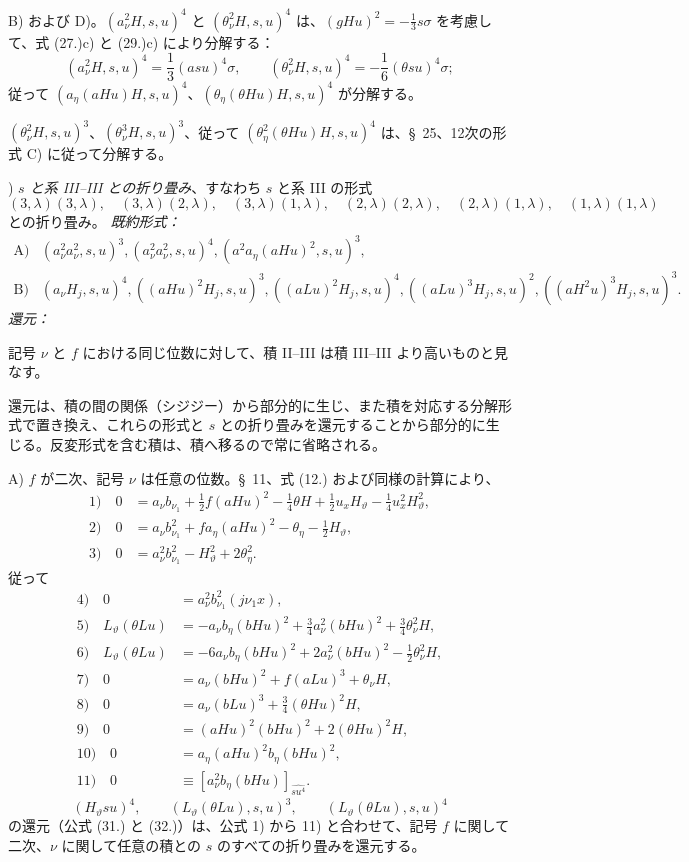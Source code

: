 \documentclass[11pt]{article}
\begin{document}
B) および D)。$(a_\nu^2H,s,u)^4$ と $(\theta_\nu^2H,s,u)^4$ は、$(gHu)^2=-\frac13s\sigma$ を考慮して、式 (27.)c) と (29.)c) により分解する：
\[
(a_\nu^2H,s,u)^4=\frac13(asu)^4\sigma,
\qquad
(\theta_\nu^2H,s,u)^4=-\frac16(\theta su)^4\sigma;
\]
従って $(a_\eta(aHu)H,s,u)^4$、$(\theta_\eta(\theta Hu)H,s,u)^4$ が分解する。

$(\theta_\nu^2H,s,u)^3$、$(\theta_\nu^3H,s,u)^3$、従って $(\theta_\eta^2(\theta Hu)H,s,u)^4$ は、\S\ 25、12次の形式 C) に従って分解する。

) \emph{$s$ と系 III--III との折り畳み}、すなわち $s$ と系 III の形式
\[
(3,\lambda)(3,\lambda),\quad (3,\lambda)(2,\lambda),\quad (3,\lambda)(1,\lambda),\quad
(2,\lambda)(2,\lambda),\quad (2,\lambda)(1,\lambda),\quad (1,\lambda)(1,\lambda)
\]
との折り畳み。
\noindent\emph{既約形式：}
\[
\begin{array}{rl}
\text{A)}&(a_\nu^2a_\nu^2,s,u)^3,
(a_\nu^2a_\nu^2,s,u)^4,
(a^2a_\eta(aHu)^2,s,u)^3,\\[0.3em]
\text{B)}&(a_\nu H_j,s,u)^4,
((aHu)^2H_j,s,u)^3,
((aLu)^2H_j,s,u)^4,
((aLu)^3H_j,s,u)^2,
((aH^2u)^3H_j,s,u)^3.
\end{array}
\]
\noindent\emph{還元：}

記号 $\nu$ と $f$ における同じ位数に対して、積 II--III は積 III--III より高いものと見なす。

還元は、積の間の関係（シジジー）から部分的に生じ、また積を対応する分解形式で置き換え、これらの形式と $s$ との折り畳みを還元することから部分的に生じる。反変形式を含む積は、積へ移るので常に省略される。

A) $f$ が二次、記号 $\nu$ は任意の位数。\S\ 11、式 (12.) および同様の計算により、
\begin{align*}
1)\quad 0&=a_\nu b_{\nu_1}+\frac12f(aHu)^2-\frac14\theta H+\frac12u_xH_\vartheta-\frac14u_x^2H_\vartheta^2,\\
2)\quad 0&=a_\nu b_{\nu_1}^2+f a_\eta(aHu)^2-\theta_\eta-\frac12H_\vartheta,\\
3)\quad 0&=a_\nu^2b_{\nu_1}^2-H_\vartheta^2+2\theta_\eta^2.
\end{align*}
従って
\begin{align*}
4)\quad 0&=a_\nu^2b_{\nu_1}^2(j\nu_1x),\\
5)\quad L_\vartheta(\theta Lu)&=-a_\nu b_\eta(bHu)^2+\frac34a_\nu^2(bHu)^2+\frac34\theta_\nu^2H,\\
6)\quad L_\vartheta(\theta Lu)&=-6a_\nu b_\eta(bHu)^2+2a_\nu^2(bHu)^2-\frac12\theta_\nu^2H,\\
7)\quad 0&=a_\nu(bHu)^2+f(aLu)^3+\theta_\nu H,\\
8)\quad 0&=a_\nu(bLu)^3+\frac34(\theta Hu)^2H,\\
9)\quad 0&=(aHu)^2(bHu)^2+2(\theta Hu)^2H,\\
10)\quad 0&=a_\eta(aHu)^2b_\eta(bHu)^2,\\
11)\quad 0&\equiv [a_\nu^2b_\eta(bHu)]_{\widehat{su^4}}.
\end{align*}
\[
(H_\vartheta su)^4,
\qquad (L_\vartheta(\theta Lu),s,u)^3,
\qquad (L_\vartheta(\theta Lu),s,u)^4
\]
の還元（公式 (31.) と (32.)）は、公式 1) から 11) と合わせて、記号 $f$ に関して二次、$\nu$ に関して任意の積との $s$ のすべての折り畳みを還元する。
\end{document}
